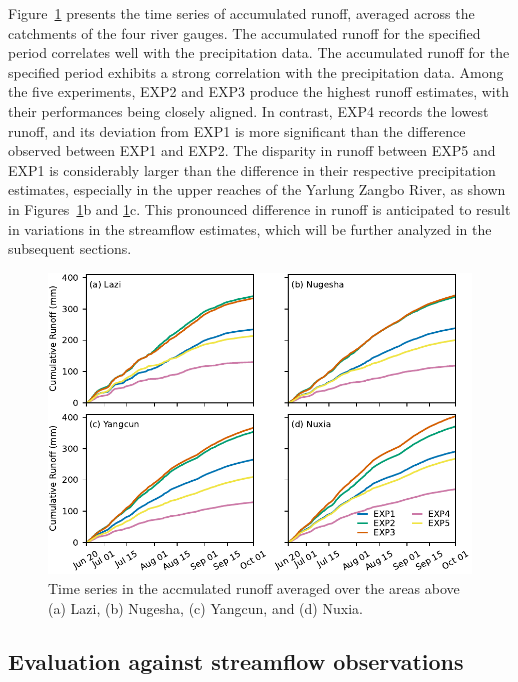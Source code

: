 \documentclass[draft]{agujournal2019}
\begin{document}
Figure~\ref{fig:rncumupts} presents the time series of accumulated runoff, averaged across the catchments of the four river gauges. The accumulated runoff for the specified period correlates well with the precipitation data. The accumulated runoff for the specified period exhibits a strong correlation with the precipitation data. Among the five experiments, EXP2 and EXP3 produce the highest runoff estimates, with their performances being closely aligned. In contrast, EXP4 records the lowest runoff, and its deviation from EXP1 is more significant than the difference observed between EXP1 and EXP2. The disparity in runoff between EXP5 and EXP1 is considerably larger than the difference in their respective precipitation estimates, especially in the upper reaches of the Yarlung Zangbo River, as shown in Figures~\ref{fig:rncumupts}b and \ref{fig:rncumupts}c. This pronounced difference in runoff is anticipated to result in variations in the streamflow estimates, which will be further analyzed in the subsequent sections.

\begin{figure}[h!]
  \centering
  \noindent\includegraphics[width=140mm]{prrn_rncumupts.pdf}
  \caption{Time series in the accmulated runoff averaged over the areas above (a) Lazi, (b) Nugesha, (c) Yangcun, and (d) Nuxia. \label{fig:rncumupts}}
\end{figure}

\subsection{Evaluation against streamflow observations}
\end{document}

